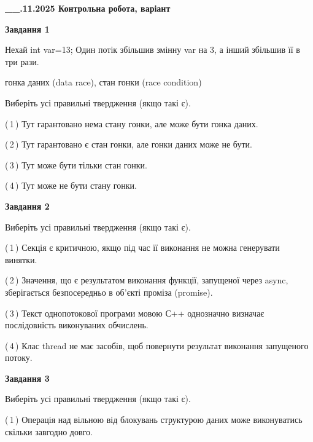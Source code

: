 \documentclass[12pt, ukrainian]{article}
\begin{document}
\begin {large}

\textbf{\_\_.11.2025 Контрольна робота, варіант  }\par


{

\begin{center}
\textbf{Завдання 1}
\end{center}
Нехай int var=13; Один потік збільшив змінну var на 3, а інший збільшив її в три рази.

гонка даних (data race), стан гонки (race condition)

Виберіть усі правильні твердження (якщо такі є).\par
\vspace{2mm}
(\,1\,) Тут гарантовано нема стану гонки, але може бути гонка даних.%

(\,2\,) Тут гарантовано є стан гонки, але гонки даних може не бути.%

(\,3\,) Тут може бути тільки стан гонки.%

(\,4\,) Тут може не бути стану гонки.%



\begin{center}
\textbf{Завдання 2}
\end{center}
Виберіть усі правильні твердження (якщо такі є).\par
\vspace{2mm}

(\,1\,) Секція є критичною, якщо під час її виконання не можна генерувати винятки.%

(\,2\,) Значення, що є результатом виконання функції, запущеної через async, зберігається безпосередньо в об’єкті проміза (promise).%

(\,3\,) Текст однопотокової програми мовою С++ однозначно визначає послідовність виконуваних обчислень.%

(\,4\,) Клас thread не має засобів, щоб повернути результат виконання запущеного потоку.%



\begin{center}
\textbf{Завдання 3}
\end{center}
Виберіть усі правильні твердження (якщо такі є).\par
\vspace{2mm}

(\,1\,) Операція над вільною від блокувань структурою даних може виконуватись скільки завгодно довго.%

}
\end{large}
\end{document}
